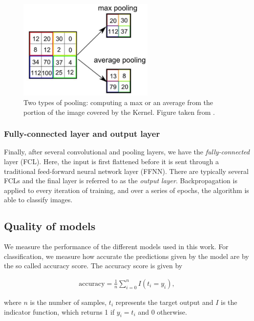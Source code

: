 \documentclass[../main.tex]{subfiles}
\begin{document}
\begin{figure}
    \centering
    \includegraphics[width=0.6\textwidth]{doc/fig/pooling.jpeg}
    \caption{Two types of pooling: computing a max or an average from the portion of the image covered by the Kernel. Figure taken from \cite{sumit2018}.}
    \label{fig:pooling}
\end{figure}

\subsubsection{Fully-connected layer and output layer}
Finally, after several convolutional and pooling layers, we have the \textit{fully-connected} layer (FCL). Here, the input is first flattened before it is sent through a traditional feed-forward neural network layer (FFNN). There are typically several FCLs and the final layer is referred to as the \textit{output layer}. Backpropagation is applied to every iteration of training, and over a series of epochs, the algorithm is able to classify images. %

\subsection{Quality of models}
We measure the performance of the different models used in this work. For classification, we measure how accurate the predictions given by the model are by the so called accuracy score. The accuracy score is given by

\begin{align}
    \text{accuracy}=\frac{1}{n}\sum_{i=0}^nI(t_i=y_i),
    \label{eq:accuracy-score}
\end{align}

where $n$ is the number of samples, $t_i$ represents the target output and $I$ is the indicator function, which returns 1 if \ensuremath{y_i=t_i} and 0 otherwise. 
\end{document}

